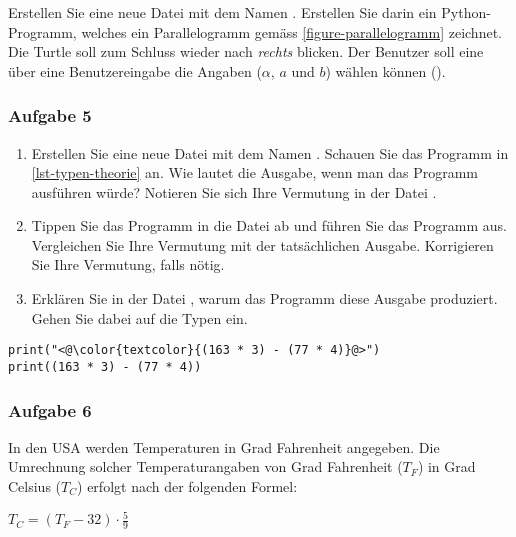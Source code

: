\subsubsection{}

Erstellen Sie eine neue Datei mit dem Namen . Erstellen Sie darin ein Python-Programm, welches ein Parallelogramm gemäss \autoref{figure-parallelogramm} zeichnet. Die Turtle soll zum Schluss wieder nach \textit{rechts} blicken. Der Benutzer soll eine über eine Benutzereingabe die Angaben ($\alpha$, $a$ und $b$) wählen können ().

\subsubsection{Aufgabe 5}

\begin{enumerate}
\item Erstellen Sie eine neue Datei mit dem Namen . Schauen Sie das Programm in \autoref{lst-typen-theorie} an. Wie lautet die Ausgabe, wenn man das Programm ausführen würde? Notieren Sie sich Ihre Vermutung in der Datei .
\item Tippen Sie das Programm in die Datei  ab und führen Sie das Programm aus. Vergleichen Sie Ihre Vermutung mit der tatsächlichen Ausgabe. Korrigieren Sie Ihre Vermutung, falls nötig.
\item Erklären Sie in der Datei , warum das Programm diese Ausgabe produziert. Gehen Sie dabei auf die Typen ein.
\end{enumerate}

\begin{lstlisting}[caption={Wie lautet die Ausgabe und warum?}, label=lst-typen-theorie, showstringspaces=false]
print("<@\color{textcolor}{(163 * 3) - (77 * 4)}@>")
print((163 * 3) - (77 * 4))
\end{lstlisting}

\subsubsection{Aufgabe 6}

In den USA werden Temperaturen in Grad Fahrenheit angegeben. Die Umrechnung solcher Temperaturangaben von Grad Fahrenheit ($T_F$) in Grad Celsius ($T_C$) erfolgt nach der folgenden Formel:

\begin{center}
$T_C = (T_F - 32 ) \cdot \frac{5}{9}$
\end{center}

